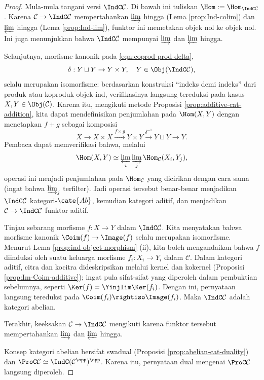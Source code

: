 \begin{proof}
	Mula-mula tangani versi $\IndC\mathcal{C}$. Di bawah ini tuliskan $\Hom:=\Hom_{\IndC\mathcal{C}}$. Karena $\mathcal{C}\to\IndC\mathcal{C}$ mempertahankan $\varinjlim$ hingga (Lema \ref{prop:Ind-colim}) dan $\varprojlim$ hingga (Lema \ref{prop:Ind-lim}), funktor ini memetakan objek nol ke objek nol. Ini juga menunjukkan bahwa $\IndC\mathcal{C}$ mempunyai $\varinjlim$ dan $\varprojlim$ hingga.
	
	Selanjutnya, morfisme kanonik pada \eqref{eqn:coprod-prod-delta},
	\[ \delta: Y \sqcup Y \to Y \times Y, \quad Y \in \Obj(\IndC\mathcal{C}), \]
	selalu merupakan isomorfisme: berdasarkan konstruksi ``indeks demi indeks'' dari produk atau koproduk objek-ind, verifikasinya langsung tereduksi pada kasus $X,Y\in\Obj(\mathcal{C})$. Karena itu, mengikuti metode Proposisi \ref{prop:additive-cat-addition}, kita dapat mendefinisikan penjumlahan pada $\Hom(X,Y)$ dengan menetapkan $f+g$ sebagai komposisi
	\[ X \to X \times X \xrightarrow{f \times g} Y \times Y \xrightarrow{\delta^{-1}} Y \sqcup Y \to Y. \]
	Pembaca dapat memverifikasi bahwa, melalui
	\[ \Hom(X,Y)\simeq\varprojlim_i\varinjlim_j\Hom_{\mathcal{C}}(X_i,Y_j), \]
	operasi ini menjadi penjumlahan pada $\Hom_{\mathcal{C}}$ yang dicirikan dengan cara sama (ingat bahwa $\varinjlim_j$ terfilter). Jadi operasi tersebut benar-benar menjadikan $\IndC\mathcal{C}$ kategori-$\cate{Ab}$, kemudian kategori aditif, dan menjadikan $\mathcal{C}\to\IndC\mathcal{C}$ funktor aditif.
	
	Tinjau sebarang morfisme $f:X\to Y$ dalam $\IndC\mathcal{C}$. Kita menyatakan bahwa morfisme kanonik $\Coim(f)\to\Image(f)$ selalu merupakan isomorfisme. Menurut Lema \ref{prop:ind-object-morphism} (ii), kita boleh mengandaikan bahwa $f$ diinduksi oleh suatu keluarga morfisme $f_i:X_i\to Y_i$ dalam $\mathcal{C}$. Dalam kategori aditif, citra dan kocitra dideskripsikan melalui kernel dan kokernel (Proposisi \ref{prop:Im-Coim-additive}); ingat pula sifat-sifat yang diperoleh dalam pembuktian sebelumnya, seperti $\Ker(f)=\Yinjlim\Ker(f_i)$. Dengan ini, pernyataan langsung tereduksi pada $\Coim(f_i)\rightiso\Image(f_i)$. Maka $\IndC\mathcal{C}$ adalah kategori abelian.
	
	Terakhir, keeksakan $\mathcal{C}\to\IndC\mathcal{C}$ mengikuti karena funktor tersebut mempertahankan $\varinjlim$ dan $\varprojlim$ hingga.
	
	Konsep kategori abelian bersifat swadual (Proposisi \ref{prop:abelian-cat-duality}) dan $\ProC\mathcal{C}\simeq\IndC(\mathcal{C}^{\opp})^{\opp}$. Karena itu, pernyataan dual mengenai $\ProC\mathcal{C}$ langsung diperoleh.
\end{proof}

